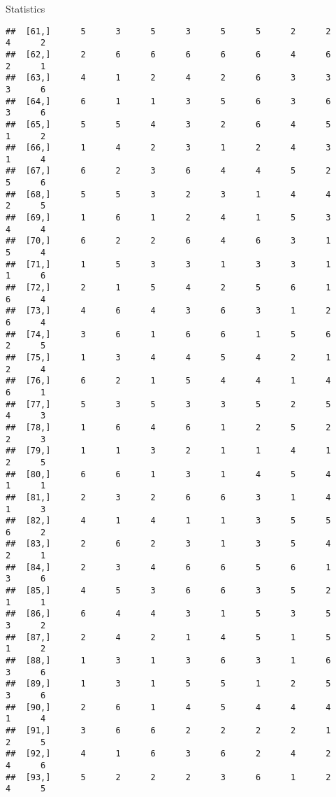 \documentclass[
  ignorenonframetext,
]{beamer}
\begin{document}
\begin{frame}[fragile]{Statistics}
\begin{verbatim}
##  [61,]      5      3      5      3      5      5      2      2      4      2
##  [62,]      2      6      6      6      6      6      4      6      2      1
##  [63,]      4      1      2      4      2      6      3      3      3      6
##  [64,]      6      1      1      3      5      6      3      6      3      6
##  [65,]      5      5      4      3      2      6      4      5      1      2
##  [66,]      1      4      2      3      1      2      4      3      1      4
##  [67,]      6      2      3      6      4      4      5      2      5      6
##  [68,]      5      5      3      2      3      1      4      4      2      5
##  [69,]      1      6      1      2      4      1      5      3      4      4
##  [70,]      6      2      2      6      4      6      3      1      5      4
##  [71,]      1      5      3      3      1      3      3      1      1      6
##  [72,]      2      1      5      4      2      5      6      1      6      4
##  [73,]      4      6      4      3      6      3      1      2      6      4
##  [74,]      3      6      1      6      6      1      5      6      2      5
##  [75,]      1      3      4      4      5      4      2      1      2      4
##  [76,]      6      2      1      5      4      4      1      4      6      1
##  [77,]      5      3      5      3      3      5      2      5      4      3
##  [78,]      1      6      4      6      1      2      5      2      2      3
##  [79,]      1      1      3      2      1      1      4      1      2      5
##  [80,]      6      6      1      3      1      4      5      4      1      1
##  [81,]      2      3      2      6      6      3      1      4      1      3
##  [82,]      4      1      4      1      1      3      5      5      6      2
##  [83,]      2      6      2      3      1      3      5      4      2      1
##  [84,]      2      3      4      6      6      5      6      1      3      6
##  [85,]      4      5      3      6      6      3      5      2      1      1
##  [86,]      6      4      4      3      1      5      3      5      3      2
##  [87,]      2      4      2      1      4      5      1      5      1      2
##  [88,]      1      3      1      3      6      3      1      6      3      6
##  [89,]      1      3      1      5      5      1      2      5      3      6
##  [90,]      2      6      1      4      5      4      4      4      1      4
##  [91,]      3      6      6      2      2      2      2      1      2      5
##  [92,]      4      1      6      3      6      2      4      2      4      6
##  [93,]      5      2      2      2      3      6      1      2      4      5

\end{verbatim}
\end{frame}
\end{document}
